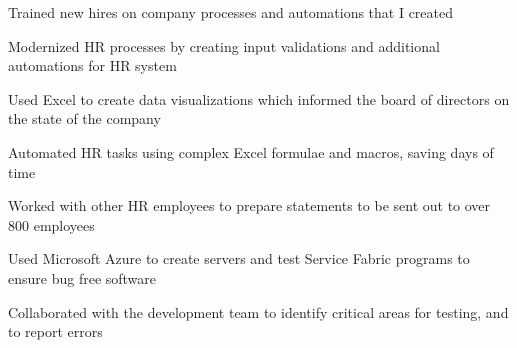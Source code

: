 \documentclass[]{deedy-resume-openfont}
\begin{document}
\begin{minipage}[t]{0.95\textwidth}
\begin{tightemize}
\item Trained new hires on company processes and automations that I created
\item Modernized HR processes by creating input validations and additional automations for HR system
\end{tightemize}

\begin{tightemize}
\item Used Excel to create data visualizations which informed the board of directors on the state of the company
\item Automated HR tasks using complex Excel formulae and macros, saving days of time
\item Worked with other HR employees to prepare statements to be sent out to over 800 employees
\end{tightemize}


\begin{tightemize}
\item Used Microsoft Azure to create servers and test Service Fabric programs to ensure bug free software
\item Collaborated with the development team to identify critical areas for testing, and to report errors
\end{tightemize}





\end{minipage}
\end{document}
